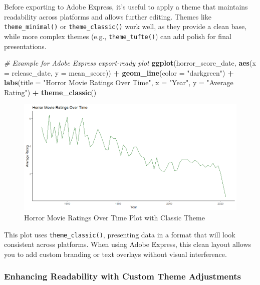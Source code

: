 \documentclass[
]{book}
\newenvironment{Shaded}{\begin{snugshade}}{\end{snugshade}}
\newcommand{\AttributeTok}[1]{\textcolor[rgb]{0.13,0.29,0.53}{#1}}
\newcommand{\CommentTok}[1]{\textcolor[rgb]{0.56,0.35,0.01}{\textit{#1}}}
\newcommand{\FunctionTok}[1]{\textcolor[rgb]{0.13,0.29,0.53}{\textbf{#1}}}
\newcommand{\NormalTok}[1]{#1}
\newcommand{\SpecialCharTok}[1]{\textcolor[rgb]{0.81,0.36,0.00}{\textbf{#1}}}
\newcommand{\StringTok}[1]{\textcolor[rgb]{0.31,0.60,0.02}{#1}}
\begin{document}
Before exporting to Adobe Express, it's useful to apply a theme that maintains readability across platforms and allows further editing. Themes like \texttt{theme\_minimal()} or \texttt{theme\_classic()} work well, as they provide a clean base, while more complex themes (e.g., \texttt{theme\_tufte()}) can add polish for final presentations.

\begin{Shaded}
\begin{Highlighting}[]
\CommentTok{\# Example for Adobe Express export{-}ready plot}
\FunctionTok{ggplot}\NormalTok{(horror\_score\_date, }\FunctionTok{aes}\NormalTok{(}\AttributeTok{x =}\NormalTok{ release\_date, }\AttributeTok{y =}\NormalTok{ mean\_score)) }\SpecialCharTok{+}
  \FunctionTok{geom\_line}\NormalTok{(}\AttributeTok{color =} \StringTok{"darkgreen"}\NormalTok{) }\SpecialCharTok{+}
  \FunctionTok{labs}\NormalTok{(}\AttributeTok{title =} \StringTok{"Horror Movie Ratings Over Time"}\NormalTok{, }\AttributeTok{x =} \StringTok{"Year"}\NormalTok{, }\AttributeTok{y =} \StringTok{"Average Rating"}\NormalTok{) }\SpecialCharTok{+}
  \FunctionTok{theme\_classic}\NormalTok{()}
\end{Highlighting}
\end{Shaded}

\begin{figure}
\centering
\includegraphics[width=1\textwidth,height=\textheight]{images/horror_classic.png}
\caption{Horror Movie Ratings Over Time Plot with Classic Theme}
\end{figure}

This plot uses \texttt{theme\_classic()}, presenting data in a format that will look consistent across platforms. When using Adobe Express, this clean layout allows you to add custom branding or text overlays without visual interference.

\subsubsection*{Enhancing Readability with Custom Theme Adjustments}\label{enhancing-readability-with-custom-theme-adjustments}
\end{document}
